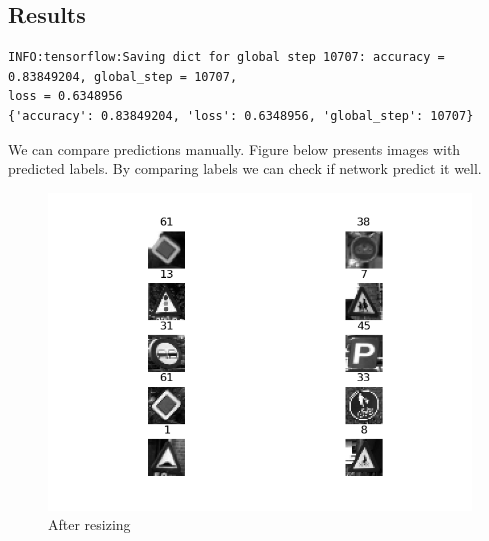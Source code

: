 \documentclass[]{report}
\begin{document}
\subsection{Results}
\begin{verbatim}INFO:tensorflow:Saving dict for global step 10707: accuracy = 0.83849204, global_step = 10707, 
loss = 0.6348956
{'accuracy': 0.83849204, 'loss': 0.6348956, 'global_step': 10707}
\end{verbatim}
We can compare predictions manually. Figure below presents images with predicted labels. By comparing labels we can check if network predict it well.
\begin{figure}[H]
\centerline{\includegraphics[scale=0.9]{sampleResult}}
\caption{After resizing}
\end{figure}
\end{document}
